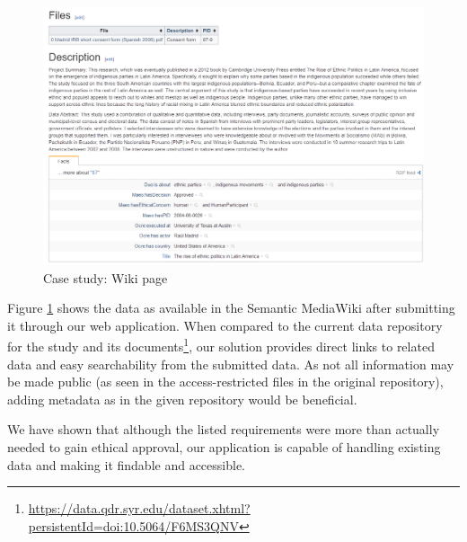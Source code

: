 \documentclass[10pt]{article}
\begin{document}
\begin{figure}[H]
\centering
	\includegraphics[width=1\textwidth]{img/4.png}
	\caption{Case study: Wiki page}
	\label{fig:4}
\end{figure}

Figure \ref{fig:4} shows the data as available in the Semantic MediaWiki after submitting it through our web application. When compared to the current data repository for the study and its documents\footnote{\url{https://data.qdr.syr.edu/dataset.xhtml?persistentId=doi:10.5064/F6MS3QNV}}, our solution provides direct links to related data and easy searchability from the submitted data. As not all information may be made public (as seen in the access-restricted files in the original repository), adding metadata as in the given repository would be beneficial.

We have shown that although the listed requirements were more than actually needed to gain ethical approval, our application is capable of handling existing data and making it findable and accessible. 
\end{document}
